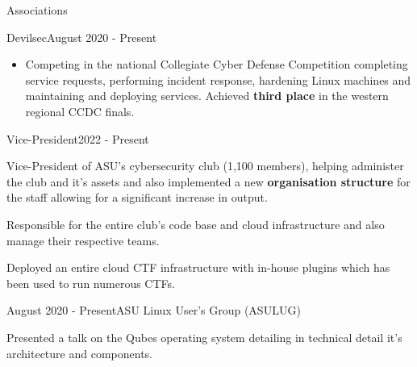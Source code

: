 \documentclass{article}
\newlength{\tabin}
\newlength{\secsep}
\newcommand{\lineunder}{\vspace*{-8pt} \\ \hspace*{-6pt} \hrulefill \\ \vspace*{-15pt}}
\newenvironment{tabbedsection}[1]{
  \begin{list}{}{
      \setlength{\itemsep}{0pt}
      \setlength{\labelsep}{0pt}
      \setlength{\labelwidth}{0pt}
      \setlength{\leftmargin}{0pt}
      \setlength{\rightmargin}{\tabin}
      \setlength{\listparindent}{0pt}
      \setlength{\parsep}{0pt}
      \setlength{\parskip}{0pt}
      \setlength{\partopsep}{0pt}
      \setlength{\topsep}{#1}
    }
  \item[]
}{\end{list}}
\newenvironment{resume_section}[1]{
  \filbreak
  \vspace{2\secsep}
  \textsc{\color{blue}\large#1}
  \lineunder
  \begin{tabbedsection}{\secsep}
}{\end{tabbedsection}}
\newenvironment{resume_subsection}[2]{
  \textbf{\color{BlueViolet}#2} \hfill {\normalsize (#1)} \hspace{-5em}
  \begin{tabbedsection}{0.5\secsep}
  \begin{subitems}
}{\end{subitems}\end{tabbedsection}}
\newenvironment{subitems}{
  \renewcommand{\labelitemi}{-}
  \begin{itemize}
      \setlength{\labelsep}{1em}
}{\end{itemize}}
\newenvironment{resume_employer}[3]{
  \vspace{\secsep}
  \textbf{\color{BlueViolet}#1} \hfill {\normalsize (#3)} \hspace{-5em}
  \begin{tabbedsection}{0pt}
    \ifthenelse{\isempty{#2}}%
        {}%
        {\textbf{#2}}%
}{\end{tabbedsection}}
\newenvironment{resume_position}[2]{
    \vspace{\secsep}
    \textbf{#1} \hfill {\normalsize (#2)} \hspace{-2.64em}
    \begin{subitems}
}{\end{subitems}}
\begin{document}
\begin{resume_section}{Associations}
    \begin{resume_employer}{Devilsec}{}{August 2020 - Present}
        \begin{subitems}
        \item Competing in the national Collegiate Cyber Defense Competition completing service requests, performing incident response, hardening Linux machines and maintaining and deploying services. Achieved \textbf{third place} in the western regional CCDC finals.
        \end{subitems}

        \begin{resume_position}{Vice-President}{2022 - Present}
            \item Vice-President of ASU's cybersecurity club (1,100 members), helping administer the club and it's assets and also implemented a new \textbf{organisation structure} for the staff allowing for a significant increase in output.
            \item Responsible for the entire club's code base and cloud infrastructure and also manage their respective teams.
            \item Deployed an entire cloud CTF infrastructure with in-house plugins which has been used to run numerous CTFs.
        \end{resume_position}
    \end{resume_employer}
    \vspace{2\secsep}
    \begin{resume_subsection}{August 2020 - Present}{ASU Linux User's Group (ASULUG)}
        \item Presented a talk on the Qubes operating system detailing in technical detail it's architecture and components. \href{https://tayari.gg/talks/qubes-technical-introduction/}{\faExternalLinkSquare*}
    \end{resume_subsection}
\end{resume_section}
\end{document}
